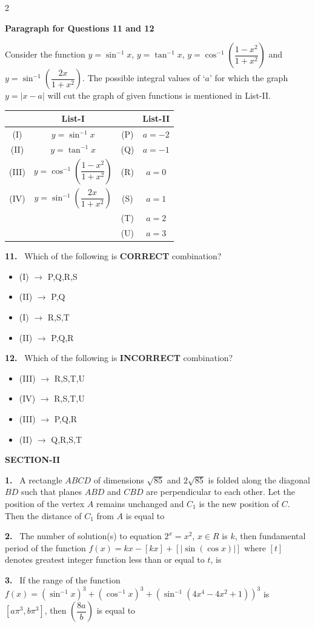 \documentclass[10pt]{extarticle}
\newcommand{\sect}[1]{\par\smallskip\noindent\textbf{#1}\par}
\newcommand{\qn}[1]{\par\smallskip\noindent\textbf{#1.}~}
\newcommand{\paraq}[2]{\par\smallskip\noindent\textbf{Paragraph for Questions #1 and #2}\par}
\newenvironment{qoptions}{\begin{itemize}[leftmargin=1.8em,itemsep=1pt,topsep=2pt,label={}]}{\end{itemize}}
\newcommand{\opt}[2]{\item[(#1)] #2}
\begin{document}
\begin{multicols}{2}
\paraq{11}{12}
Consider the function $y=\sin^{-1}x$, $y=\tan^{-1}x$, $y=\cos^{-1}\!\left(\dfrac{1-x^2}{1+x^2}\right)$ and $y=\sin^{-1}\!\left(\dfrac{2x}{1+x^2}\right)$. The possible integral values of `$a$' for which the graph $y=|x-a|$ will cut the graph of given functions is mentioned in List-II.
\par\smallskip
\begin{center}\small
\renewcommand{\arraystretch}{1.3}
\begin{tabular}{|c|c|c|c|}
\hline
 & List-I & & List-II\\
\hline
(I) & $y=\sin^{-1}x$ & (P) & $a=-2$\\
\hline
(II) & $y=\tan^{-1}x$ & (Q) & $a=-1$\\
\hline
(III) & $y=\cos^{-1}\!\left(\dfrac{1-x^2}{1+x^2}\right)$ & (R) & $a=0$\\
\hline
(IV) & $y=\sin^{-1}\!\left(\dfrac{2x}{1+x^2}\right)$ & (S) & $a=1$\\
\hline
 & & (T) & $a=2$\\
\hline
 & & (U) & $a=3$\\
\hline
\end{tabular}
\end{center}
\qn{11} Which of the following is \textbf{CORRECT} combination?
\begin{qoptions}
\opt{A}{(I) $\to$ P,Q,R,S}
\opt{B}{(II) $\to$ P,Q}
\opt{C}{(I) $\to$ R,S,T}
\opt{D}{(II) $\to$ P,Q,R}
\end{qoptions}

\qn{12} Which of the following is \textbf{INCORRECT} combination?
\begin{qoptions}
\opt{A}{(III) $\to$ R,S,T,U}
\opt{B}{(IV) $\to$ R,S,T,U}
\opt{C}{(III) $\to$ P,Q,R}
\opt{D}{(II) $\to$ Q,R,S,T}
\end{qoptions}

\sect{SECTION-II}
\qn{1} A rectangle $ABCD$ of dimensions $\sqrt{85}$ and $2\sqrt{85}$ is folded along the diagonal $BD$ such that planes $ABD$ and $CBD$ are perpendicular to each other. Let the position of the vertex $A$ remains unchanged and $C_1$ is the new position of $C$. Then the distance of $C_1$ from $A$ is equal to

\qn{2} The number of solution(s) to equation $2^x=x^2$, $x\in R$ is $k$, then fundamental period of the function $f(x)=kx-[kx]+[|\sin(\cos x)|]$ where $[t]$ denotes greatest integer function less than or equal to $t$, is

\qn{3} If the range of the function $f(x)=(\sin^{-1}x)^3+(\cos^{-1}x)^3+\left(\sin^{-1}\!\left(4x^4-4x^2+1\right)\right)^3$ is $[a\pi^3,b\pi^3]$, then $\left(\dfrac{8a}{b}\right)$ is equal to


\end{multicols}
\end{document}

